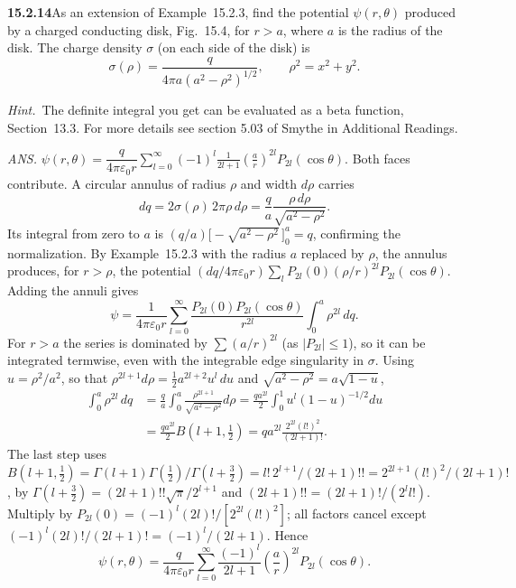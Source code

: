 \par\bigskip
\noindent\textbf{15.2.14}\quad As an extension of Example~15.2.3, find
the potential $\psi(r,\theta)$ produced by a charged conducting disk,
Fig.~15.4, for $r>a$, where $a$ is the radius of the disk. The charge
density $\sigma$ (on each side of the disk) is
\[
\sigma(\rho)=\frac{q}{4\pi a(a^{2}-\rho^{2})^{1/2}},
\qquad\rho^{2}=x^{2}+y^{2}.
\]
\par\emph{Hint.}~The definite integral you get can be evaluated as a
beta function, Section~13.3. For more details see section 5.03 of
Smythe in Additional Readings.
\par\nobreak\hfill\emph{ANS.}\enspace
$\psi(r,\theta)=\dfrac{q}{4\pi\varepsilon_{0}r}
\displaystyle\sum_{l=0}^{\infty}(-1)^{l}\frac{1}{2l+1}
\left(\frac{a}{r}\right)^{2l}P_{2l}(\cos\theta)$.
\solution
Both faces contribute. A circular annulus of radius $\rho$ and width
$d\rho$ carries
\[
dq=2\sigma(\rho)\,2\pi\rho\,d\rho
=\frac qa\frac{\rho\,d\rho}{\sqrt{a^2-\rho^2}}.
\]
Its integral from zero to $a$ is
$(q/a)\bigl[-\sqrt{a^2-\rho^2}\,\bigr]_0^a=q$, confirming the
normalization. By Example~15.2.3 with the radius $a$ replaced by $\rho$,
the annulus produces, for $r>\rho$, the potential
$(dq/4\pi\varepsilon_0r)\sum_lP_{2l}(0)(\rho/r)^{2l}P_{2l}(\cos\theta)$.
Adding the annuli gives
\[
\psi=\frac1{4\pi\varepsilon_0r}
\sum_{l=0}^\infty\frac{P_{2l}(0)P_{2l}(\cos\theta)}{r^{2l}}
\int_0^a\rho^{2l}\,dq.
\]
For $r>a$ the series is dominated by $\sum(a/r)^{2l}$ (as
$|P_{2l}|\le1$), so it can be integrated termwise,
even with the integrable edge singularity in $\sigma$.
Using $u=\rho^2/a^2$, so that $\rho^{2l+1}d\rho=\frac12a^{2l+2}u^l\,du$
and $\sqrt{a^2-\rho^2}=a\sqrt{1-u}$,
\begin{align*}
\int_0^a\rho^{2l}\,dq
&=\frac qa\int_0^a\frac{\rho^{2l+1}}{\sqrt{a^2-\rho^2}}d\rho
=\frac{qa^{2l}}2\int_0^1u^l(1-u)^{-1/2}du\\
&=\frac{qa^{2l}}2 B(l+1,\tfrac12)
=qa^{2l}\frac{2^{2l}(l!)^2}{(2l+1)!}.
\end{align*}
The last step uses
$B(l+1,\frac12)=\Gamma(l+1)\Gamma(\frac12)/\Gamma(l+\frac32)
=l!\,2^{l+1}/(2l+1)!!=2^{2l+1}(l!)^2/(2l+1)!$, by
$\Gamma(l+\frac32)=(2l+1)!!\sqrt\pi/2^{l+1}$ and
$(2l+1)!!=(2l+1)!/(2^ll!)$.
Multiply by $P_{2l}(0)=(-1)^l(2l)!/[2^{2l}(l!)^2]$; all factors
cancel except $(-1)^l(2l)!/(2l+1)!=(-1)^l/(2l+1)$. Hence
\[
\boxed{\psi(r,\theta)=\frac{q}{4\pi\varepsilon_0r}
\sum_{l=0}^\infty\frac{(-1)^l}{2l+1}
\left(\frac ar\right)^{2l}P_{2l}(\cos\theta)}.
\]

